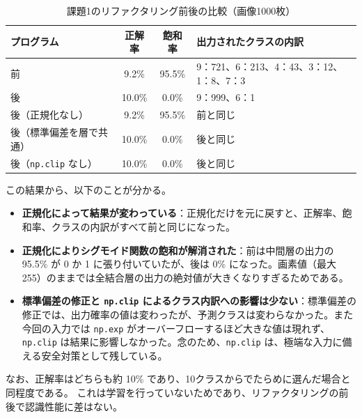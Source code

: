 \documentclass[a4paper,11pt]{ltjsarticle}
\begin{document}
\begin{table}[H]
  \centering
  \caption{課題1のリファクタリング前後の比較（画像1000枚）}
  \label{tab:k1cmp}
  \small
  \begin{tabular}{lccl}
    \toprule
    プログラム & 正解率 & 飽和率 & 出力されたクラスの内訳 \\
    \midrule
    前                       & 9.2\%  & 95.5\% & 9：721、6：213、4：43、3：12、1：8、7：3 \\
    後                       & 10.0\% & 0.0\%  & 9：999、6：1 \\
    後（正規化なし）         & 9.2\%  & 95.5\% & 前と同じ \\
    後（標準偏差を層で共通） & 10.0\% & 0.0\%  & 後と同じ \\
    後（\texttt{np.clip} なし） & 10.0\% & 0.0\%  & 後と同じ \\
    \bottomrule
  \end{tabular}
\end{table}

この結果から、以下のことが分かる。
\begin{itemize}
  \item \textbf{正規化によって結果が変わっている}：正規化だけを元に戻すと、正解率、飽和率、クラスの内訳がすべて前と同じになった。
  \item \textbf{正規化によりシグモイド関数の飽和が解消された}：前は中間層の出力の 95.5\% が 0 か 1 に張り付いていたが、後は 0\% になった。画素値（最大 255）のままでは全結合層の出力の絶対値が大きくなりすぎるためである。
  \item \textbf{標準偏差の修正と \texttt{np.clip} によるクラス内訳への影響は少ない}：標準偏差の修正では、出力確率の値は変わったが、予測クラスは変わらなかった。また今回の入力では \texttt{np.exp} がオーバーフローするほど大きな値は現れず、\texttt{np.clip} は結果に影響しなかった。念のため、\texttt{np.clip} は、極端な入力に備える安全対策として残している。
\end{itemize}

なお、正解率はどちらも約 10\% であり、10クラスからでたらめに選んだ場合と同程度である。
これは学習を行っていないためであり、リファクタリングの前後で認識性能に差はない。

\end{document}
